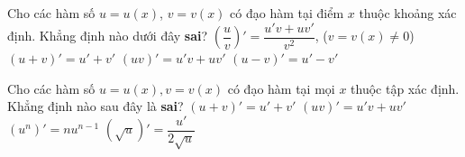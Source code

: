 \begin{ex}%
	Cho  các hàm số $u=u(x)$, $v=v(x)$ có đạo hàm tại điểm $x$ thuộc khoảng xác định. Khẳng định nào dưới đây {\bf sai}?
	 \choice
		{\True  $\left(\dfrac{u}{v}\right)'=\dfrac{u'v+uv'}{v^2}$, ($v=v(x)\neq 0$)}
		{$(u+v)'=u'+v'$} 
		 {$(uv)'=u'v+uv'$}
		{$(u-v)'=u'-v'$} 
\end{ex}

\begin{ex}%
	Cho các hàm số $u=u(x), v=v(x)$ có đạo hàm tại mọi $x$ thuộc tập xác định. Khẳng định nào sau đây là  \textbf{sai}?
	\choice 
		{$(u+v)'=u'+v'$} 
		{$(uv)'=u'v+uv'$} 
		{\True $(u^n)'=nu^{n-1}$} 
		{$(\sqrt{u})'=\dfrac{u'}{2\sqrt{u}}$} 
\end{ex}



